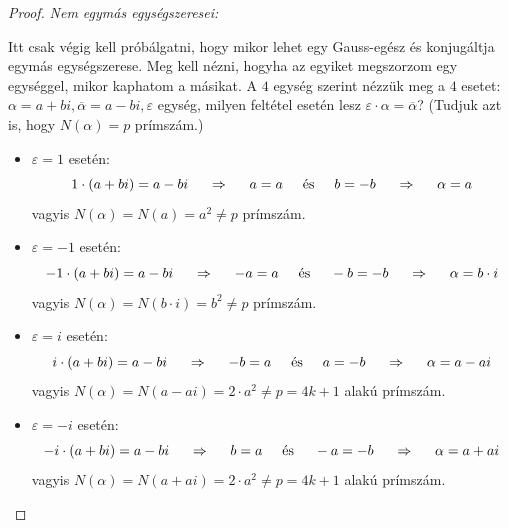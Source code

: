 \documentclass[12pt]{book}
\theoremstyle{plain} %
\theoremstyle{definition} %
\theoremstyle{remark}
\numberwithin{equation}{section}  %
\begin{document}
\begin{proof}
		\textit{Nem egymás egységszeresei:}
		
		Itt csak végig kell próbálgatni, hogy mikor lehet egy Gauss-egész és konjugáltja egymás egységszerese. Meg kell nézni, hogyha az egyiket megszorzom egy egységgel, mikor kaphatom a másikat. A $4$ egység szerint nézzük meg a $4$ esetet: $\alpha = a+bi, \overline{\alpha} = a-bi, \varepsilon$ egység, milyen feltétel esetén lesz $\varepsilon \cdot \alpha = \overline{\alpha}$? (Tudjuk azt is, hogy $N(\alpha)=p$ prímszám.)
		\begin{itemize}
			\item{$\varepsilon = 1$ esetén:
			\[ 1\cdot (a+bi) = a-bi \hspace{5mm} \Rightarrow \hspace{5mm} a=a \hspace{5mm} \text{és} \hspace{5mm} b=-b \hspace{5mm} \Rightarrow \hspace{5mm} \alpha = a \] vagyis $N(\alpha)= N(a) = a^2\neq p$ prímszám.
			}
			\item{$\varepsilon = -1$ esetén:
			\[ -1\cdot (a+bi) = a-bi \hspace{5mm} \Rightarrow \hspace{5mm} -a=a \hspace{5mm} \text{és} \hspace{5mm} -b=-b \hspace{5mm} \Rightarrow \hspace{5mm} \alpha = b\cdot i \]
			vagyis $N(\alpha)= N(b\cdot i) = b^2\neq p$ prímszám.
			}
			\item{$\varepsilon = i$ esetén:
			\[ i\cdot (a+bi) = a-bi \hspace{5mm} \Rightarrow \hspace{5mm} -b=a \hspace{5mm} \text{és} \hspace{5mm} a=-b \hspace{5mm} \Rightarrow \hspace{5mm} \alpha = a-ai \] vagyis $N(\alpha)= N(a-ai) = 2\cdot a^2\neq p = 4k+1$ alakú prímszám.
			}
			\item{$\varepsilon = -i$ esetén:
				\[ -i\cdot (a+bi) = a-bi \hspace{5mm} \Rightarrow \hspace{5mm} b=a \hspace{5mm} \text{és} \hspace{5mm} -a=-b \hspace{5mm} \Rightarrow \hspace{5mm} \alpha = a+ai \] vagyis $N(\alpha)= N(a+ai) = 2\cdot a^2\neq p = 4k+1$ alakú prímszám.
			}
		\end{itemize}
		
	\end{proof}
	
\end{document}

